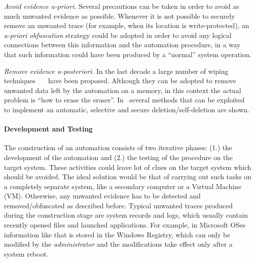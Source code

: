 \documentclass[10pt, conference]{IEEEtran}
\begin{document}
\begin{list}{}{\leftmargin=0.5em}
 \item \emph{Avoid evidence a-priori.} Several precautions can be taken in order to avoid as much unwanted evidence as possible.
 Whenever it is not possible to securely remove an unwanted trace (for example, when its location is write-protected), an
 \textit{a-priori obfuscation} strategy could be adopted in order to avoid any logical connections between this information
 and the automation procedure, in a way that such information could have been produced by a ``normal'' system operation.
 \item \emph{Remove evidence a-posteriori.} In the last decade a large number of wiping techniques~\cite{pgut01}~\cite{pgut02}~\cite{usdod5220}
 have been proposed. Although they can be adopted to remove unwanted data left by the automation on a memory, in this context
 the actual problem is ``how to erase the eraser''. In~\cite{securedel} several methods that can be exploited to implement an
 automatic, selective and secure deletion/self-deletion are shown.
\end{list}


\paragraph{Development and Testing}

The construction of an automation consists of two iterative phases: (1.) the development of the automation and (2.) the testing of
the procedure on the target system. These activities could leave lot of clues on the target system which should be avoided.
The ideal solution would be that of carrying out such tasks on a completely separate system, like a secondary computer or 
a Virtual Machine (VM). Otherwise, any unwanted evidence has to be detected and removed/obfuscated as described before.
Typical unwanted traces produced during the construction stage are system records and logs, which usually contain recently
opened files and launched applications. For example, in Microsoft OSes information like that is stored in the Windows Registry,
which can only be modified by the \emph{administrator} and the modifications take effect only after a system reboot.
\end{document}
